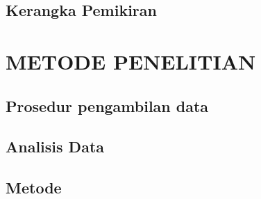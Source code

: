 \documentclass[a4paper,12pt]{report}
\begin{document}
\section{Kerangka Pemikiran}

\chapter{METODE PENELITIAN}
\section{Prosedur pengambilan data}
\section{Analisis Data}
\section{Metode}

\printbibliography
\end{document}
